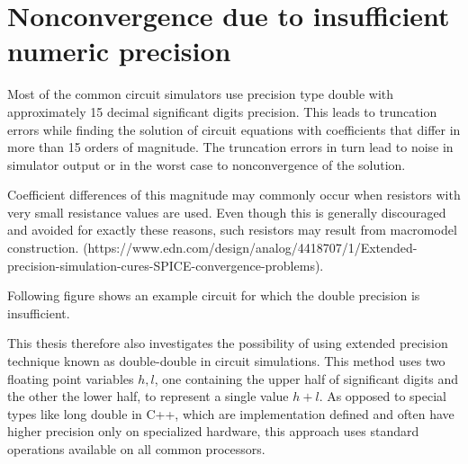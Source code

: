%

\section{Nonconvergence due to insufficient numeric precision}

Most of the common circuit simulators use precision type  double with approximately 15 decimal significant digits precision. This leads to truncation errors while finding the solution of circuit equations with coefficients that differ in more than 15 orders of magnitude. The truncation errors in turn lead to noise in simulator output or in the worst case to nonconvergence of the solution.

Coefficient differences of this magnitude may commonly occur when resistors with very small resistance values are used. Even though this is generally discouraged and avoided for exactly these reasons, such resistors may result from macromodel  construction.  (https://www.edn.com/design/analog/4418707/1/Extended-precision-simulation-cures-SPICE-convergence-problems).

Following figure shows an example circuit for which the double precision is insufficient.


This thesis therefore also investigates the possibility of using extended precision technique known as double-double in circuit simulations. This method uses two floating point variables $h, l$, one containing the upper half of significant digits and the other the lower half, to represent a single value $h + l$. As opposed to special types like  long double in C++, which are implementation defined and often have higher precision only on specialized hardware, this approach uses standard operations available on all common processors. 

